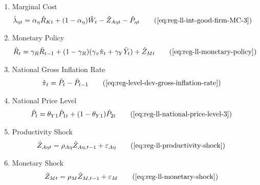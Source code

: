 \documentclass[../thesis.tex]{subfiles}
\begin{document}
{\begin{itemize}
\begin{enumerate}
		\begin{comment}

		\item Marginal Rates of Substitution of Factors
		\begin{align}
			\hat{K}_{\eta t} - \hat{L}_{\eta t} &= \hat{W}_{t} - \hat{R}_{K t} \tag{\ref{eq:reg-ll-int-good-firm-TMRS}}
		\end{align}
			
		\end{comment}
		
		
		\item Marginal Cost
		\begin{alignat}{2}
			\hat{\lambda}_{\eta t} &= {\alpha_{\eta}} \hat{R}_{Kt} + (1- {\alpha_{\eta}}) \hat{W}_{t} - \hat{Z}_{A\eta t} - \hat{P}_{\eta t} \tag{\ref{eq:reg-ll-int-good-firm-MC-3}}
		\end{alignat}
		
		\item Monetary Policy
		\begin{align}
			& \hat{R}_t = \gamma_R \hat{R}_{t-1} + (1-\gamma_R)(\gamma_\pi \hat{\pi}_t + \gamma_Y \hat{Y}_t) + \hat{Z}_{Mt} \tag{\ref{eq:reg-ll-monetary-policy}}
		\end{align}
		
		\item National Gross Inflation Rate
		\begin{align}
			\hat{\pi}_{t} &= \hat{P}_{t} - \hat{P}_{t-1} \tag{\ref{eq:reg-level-dev-gross-inflation-rate}}
		\end{align}
		
		\item National Price Level
		\begin{alignat}{2}
			\hat{P}_{t} &= \theta_{Y1} \hat{P}_{1t} + (1-\theta_{Y1}) \hat{P}_{2t} \tag{\ref{eq:reg-ll-national-price-level-3}}
		\end{alignat}
		
		\item Productivity Shock
		\begin{alignat}{2}
			\hat{Z}_{A\eta t} &= \rho_{A\eta} \hat{Z}_{A\eta, t-1} + \varepsilon_{A\eta} \tag{\ref{eq:reg-ll-productivity-shock}}
		\end{alignat}
		
		\item Monetary Shock
		\begin{alignat}{2}
			\hat{Z}_{Mt} &= \rho_M \hat{Z}_{M,t-1} + \varepsilon_{M} \tag{\ref{eq:reg-ll-monetary-shock}}
		\end{alignat}
		

\end{enumerate}
\end{itemize}}
\end{document}
